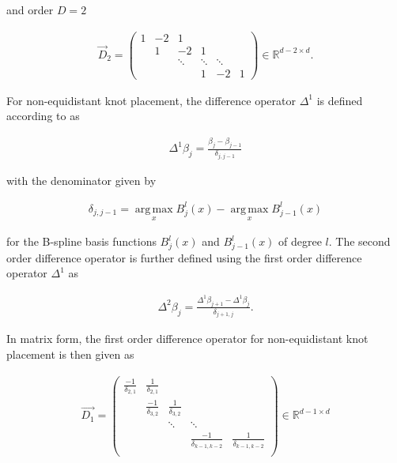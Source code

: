 \documentclass[10pt,a4paper]{report}
\begin{document}
and order $D=2$

\begin{align} \label{eq:d2-difference-matrix}
	\vec{D}_2 = 
	\begin{pmatrix} 
		1& -2& 1& &    \\  
		& 1 & -2 & 1& \\ 
		&  & \ddots & \ddots  & \ddots \\ 
		& & & 1 & -2 & 1 
	\end{pmatrix} \in \mathbb R^{d-2\times d}.
\end{align}

For non-equidistant knot placement, the difference operator $\Delta^1$ is defined according to \cite{ferziger2008numerische} as

\begin{align} \label{eq:d1-operator-nonequidistant}
	\Delta^1 \beta_j = \frac{\beta_j - \beta_{j-1}}{\delta_{j, j-1}}
\end{align}

with the denominator given by 

\begin{align} \label{eq:delta-operator}
	\delta_{j, j-1} = \operatorname*{arg\, max}_x B_j^l(x) - \operatorname*{arg\, max}_x B_{j-1}^l(x)
\end{align}

for the B-spline basis functions $B_j^l(x)$ and $B_{j-1}^l(x)$ of degree $l$. 
The second order difference operator is further defined using the first order difference operator $\Delta^1$ as 

\begin{align} \label{eq:d2-operator-nonequidistant}
	\Delta^2 \beta_j = \frac{\Delta^1 \beta_{j+1} - \Delta^1 \beta_j}{\delta_{j+1,j}}.
\end{align}

In matrix form, the first order difference operator for non-equidistant knot placement is then given as

\begin{align} \label{eq:d1-matrix-nonequidistant}
	\vec{D_1} = \begin{pmatrix}
					\frac{-1}{\delta_{2,1}} & \frac{1}{\delta_{2,1}} &                         &  \\
										   & \frac{-1}{\delta_{3,2}} & \frac{1}{\delta_{3,2}} & \\
										   & 				        & 	\ddots                 & \ddots \\
										   &                        &                         & \frac{-1}{\delta_{k-1, k-2}} & \frac{1}{\delta_{k-1, k-2}} \\ 
	\end{pmatrix} \in \mathbb{R}^{d-1 \times d}
\end{align} 
\end{document}
